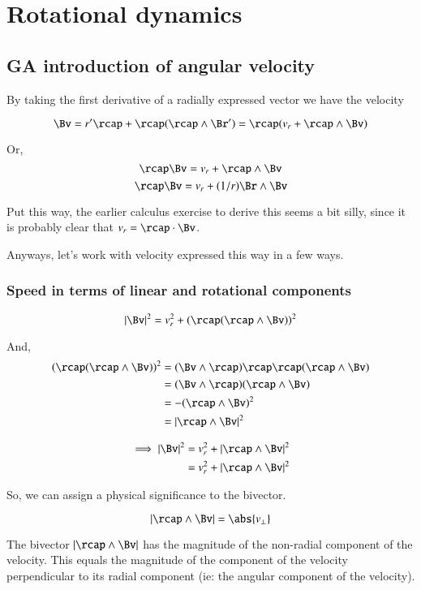 \chapter{Rotational dynamics}\label{chap:PJAngVel}

\section{GA introduction of angular velocity}

By taking the first derivative of a radially expressed vector we have the velocity 

\[
\Bv 
   = r'\rcap + \rcap(\rcap \wedge \Br')
   = \rcap( v_r + \rcap \wedge \Bv )
\]

Or,
\[
\rcap \Bv = v_r + \rcap \wedge \Bv
\]
\[
\rcap \Bv = v_r + (1/r)\Br \wedge \Bv
\]

Put this way, the earlier calculus exercise to derive this seems a bit silly, since it is probably clear that $v_r = \rcap \cdot \Bv$.

Anyways, let's work with velocity expressed this way in a few ways.

\subsection{Speed in terms of linear and rotational components}

\[
\Abs{\Bv}^2 = v_r^2 + (\rcap(\rcap \wedge \Bv))^2
\]

And,
\begin{align*}
(\rcap(\rcap \wedge \Bv))^2 
   &= (\Bv \wedge \rcap)\rcap \rcap(\rcap \wedge \Bv) \\
   &= (\Bv \wedge \rcap)(\rcap \wedge \Bv) \\
   &= -(\rcap \wedge \Bv)^2 \\
   &= \Abs{\rcap \wedge \Bv}^2 \\
\end{align*}

\begin{align*}
\implies
\Abs{\Bv}^2 &= v_r^2 + \Abs{\rcap \wedge \Bv}^2 \\
             &= v_r^2 + \Abs{\rcap \wedge \Bv}^2 \\
\end{align*}

So, we can assign a physical significance to the bivector.

\[
\Abs{\rcap \wedge \Bv} = \abs{v_{\perp}} 
\]

The bivector $\Abs{\rcap \wedge \Bv}$ has the magnitude of the non-radial component of the velocity.  This
equals the magnitude of the component of the velocity perpendicular to its radial component (ie: the angular component of the velocity).


